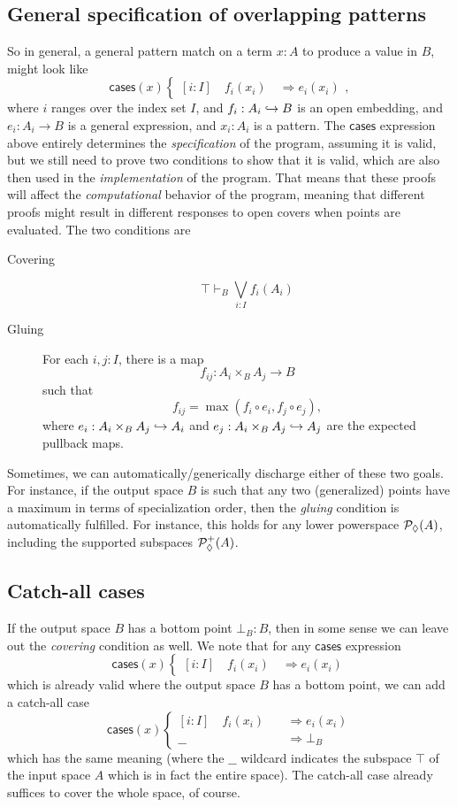\subsection{General specification of overlapping patterns}
So in general, a general pattern match on a term $x : A$ to produce a value in $B$, might look like
\[
\mathsf{cases}(x)
\begin{cases}
[i : I] \quad f_i(x_i) \quad \Longrightarrow e_i(x_i)
\end{cases},
\]
where $i$ ranges over the index set $I$, and $f_i : A_i \hookrightarrow B$ is an open embedding, and $e_i : A_i \to B$ is a general expression, and $x_i : A_i$ is a pattern. The $\mathsf{cases}$ expression above entirely determines the \emph{specification} of the program, assuming it is valid, but we still need to prove two conditions to show that it is valid, which are also then used in the \emph{implementation} of the program. That means that these proofs will affect the \emph{computational} behavior of the program, meaning that different proofs might result in different responses to open covers when points are evaluated. The two conditions are
\begin{description}
\item[Covering]
\[
\top \vdash_B \bigvee_{i : I} f_i(A_i)
\]
\item[Gluing] For each $i, j : I$, there is a map
\[
f_{ij} : A_i \times_B A_j \to B
\]
such that 
\[
f_{ij} = \max(f_i \circ e_i, f_j \circ e_j),
\]
where $e_i : A_i \times_B A_j \hookrightarrow A_i$ and $e_j : A_i \times_B A_j \hookrightarrow A_j$ are the expected pullback maps.
\end{description}

Sometimes, we can automatically/generically discharge either of these two goals. For instance, if the output space $B$ is such that any two (generalized) points have a maximum in terms of specialization order, then the \emph{gluing} condition is automatically fulfilled. For instance, this holds for any lower powerspace $\mathcal{P}_\lozenge(A)$, including the supported subspaces $\mathcal{P}_\lozenge^+(A)$.

\subsection{Catch-all cases}

If the output space $B$ has a bottom point $\bot_B : B$, then in some sense we can leave out the \emph{covering} condition as well. We note that for any $\mathsf{cases}$ expression
\[
\mathsf{cases}(x)
\begin{cases}
[i : I] \quad f_i(x_i) \quad \Longrightarrow e_i(x_i)
\end{cases}
\]
which is already valid where the output space $B$ has a bottom point, we can add a catch-all case
\[
\mathsf{cases}(x)
\begin{cases}
[i : I] \quad f_i(x_i) \quad &\Longrightarrow e_i(x_i)
\\ \_\_ \quad &\Longrightarrow \bot_B
\end{cases}
\]
which has the same meaning (where the $\_\_$ wildcard indicates the subspace $\top$ of the input space $A$ which is in fact the entire space). The catch-all case already suffices to cover the whole space, of course. 

